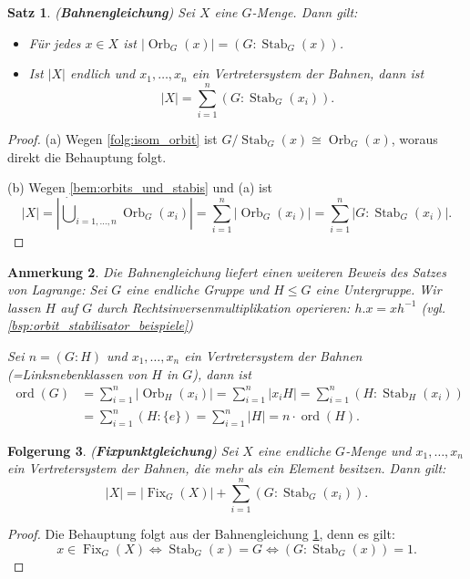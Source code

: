 \documentclass[a4paper, twoside, 11pt, ngerman]{report}
\DeclareMathOperator{\Fix}{Fix}
\DeclareMathOperator{\Orb}{Orb}
\DeclareMathOperator{\ord}{ord}
\DeclareMathOperator{\Stab}{Stab}
\theoremstyle{definistyle}
\newtheorem{satz}{Satz}[section]
\newtheorem{anm}[satz]{Anmerkung}
\newtheorem{folgerung}[satz]{Folgerung}
\theoremstyle{remark}
\newcommand{\defn}[1]{\textit{\bfseries #1}}
\begin{document}
\begin{satz}\label{satz:bahnengleichung}
(\defn{Bahnengleichung}) Sei $X$ eine $G$-Menge. Dann gilt:
\begin{itemize}
    \item[(a)] Für jedes $x \in X$ ist $|\Orb_G(x)| = (G : \Stab_G(x))$.
    \item[(b)] Ist $|X|$ endlich und $x_1, \dots, x_n$ ein Vertretersystem der Bahnen, dann ist
    \[
    |X| = \sum_{i=1}^n (G : \Stab_G(x_i)).
    \]
\end{itemize}
\end{satz}

\begin{proof}
(a) Wegen \ref{folg:isom_orbit} ist $G / \Stab_G(x) \cong \Orb_G(x)$,
woraus direkt die Behauptung folgt.

(b) Wegen \ref{bem:orbits_und_stabis} und (a) ist 
\[
|X|=|\dot\bigcup_{i=1,\ldots,n}\Orb_G(x_i)|=\sum_{i=1}^n|\Orb_G(x_i)|=\sum_{i=1}^n|G : \Stab_G(x_i)|.
\]
\end{proof}

\begin{anm}\label{anm:lagrange_satz}
Die Bahnengleichung liefert einen weiteren Beweis des Satzes von Lagrange: Sei $G$ eine endliche Gruppe und $H \leq G$ eine Untergruppe. Wir lassen $H$ auf $G$ durch Rechtsinversenmultiplikation operieren: $h . x = x h^{-1}$ (vgl. \ref{bsp:orbit_stabilisator_beispiele})

Sei $n = (G : H)$ und $x_1, \dots, x_n$ ein Vertretersystem der Bahnen (=Linksnebenklassen von $H$ in $G$), dann ist
\begin{align*}
\ord(G) &= \sum_{i=1}^n |\Orb_H(x_i)| = \sum_{i=1}^n |x_i H| = \sum_{i=1}^n (H : \Stab_H(x_i)) \\
&= \sum_{i=1}^n (H : \{e\}) = \sum_{i=1}^n |H| = n \cdot \ord(H).
\end{align*}
\end{anm}

\begin{folgerung}\label{folg:fixpunktgleichung}
(\defn{Fixpunktgleichung}) Sei $X$ eine endliche $G$-Menge und $x_1, \dots, x_n$ ein Vertretersystem der Bahnen, die mehr als ein Element besitzen. Dann gilt:
\[
|X| = |\Fix_G(X)| + \sum_{i=1}^n (G : \Stab_G(x_i)).
\]
\end{folgerung}

\begin{proof}
Die Behauptung folgt aus der Bahnengleichung \ref{satz:bahnengleichung}, denn es gilt:
\[
x\in\Fix_G(X) \Leftrightarrow \Stab_G(x) = G \Leftrightarrow (G : \Stab_G(x)) = 1.
\]
\end{proof}
\end{document}
